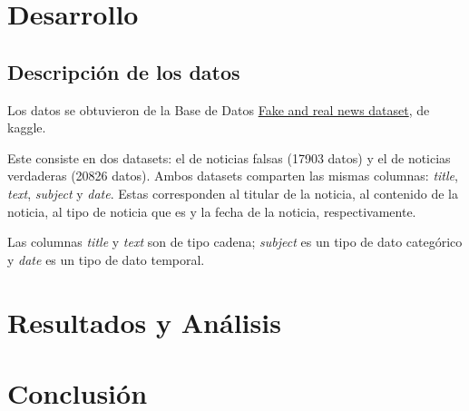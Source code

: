 \section{Desarrollo}
{
\subsection{Descripción de los datos}
{
Los datos se obtuvieron de la Base de Datos \href{https://www.kaggle.com/clmentbisaillon/fake-and-real-news-dataset}{Fake and 
real news dataset}, de kaggle. 

Este consiste en dos datasets: el de noticias falsas (17903 datos) y el de noticias verdaderas (20826 datos). Ambos datasets 
comparten las mismas columnas: \textit{title}, \textit{text}, \textit{subject} y \textit{date}. Estas corresponden al titular de
la noticia, al contenido de la noticia, al tipo de noticia que es y la fecha de la noticia, respectivamente.

Las columnas \textit{title} y \textit{text} son de tipo cadena; \textit{subject} es un tipo de dato categórico y \textit{date}
es un tipo de dato temporal. 
}
}

\section{Resultados y Análisis}
{
\lipsum[3]
}

\section{Conclusión}
{
\lipsum[4]
}